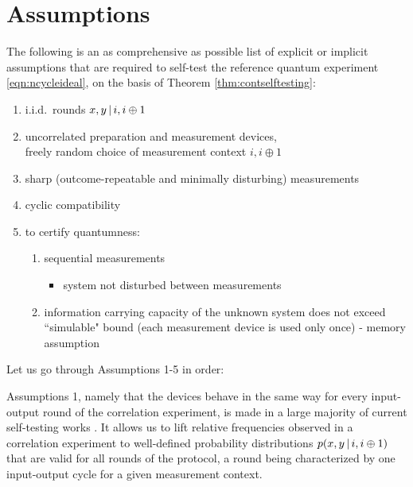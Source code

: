 \section{Assumptions}
\label{sec:kscontass}
The following is an as comprehensive as possible list of explicit or implicit assumptions that are required to self-test the reference quantum experiment \ref{eqn:ncycleideal}, on the basis of Theorem \ref{thm:contselftesting}:
\begin{enumerate}
    \item i.i.d.\ rounds $x,y \thinspace\vert\thinspace i,i\oplus 1$
    \item uncorrelated preparation and measurement devices,\\ freely random choice of measurement context $i,i\oplus 1$
    \item sharp (outcome-repeatable and minimally disturbing) measurements 
    \item cyclic compatibility
    \item to certify quantumness:
    \begin{enumerate}
    \item sequential measurements
    \begin{itemize}
        \item system not disturbed between measurements
    \end{itemize}
    \item information carrying capacity of the unknown system does not exceed ``simulable" bound (each measurement device is used only once) - memory assumption \cite{Bharti2019}
    
     \end{enumerate}
\end{enumerate}

Let us go through Assumptions 1-5 in order:

Assumptions 1, namely that the devices behave in the same way for every input-output round of the correlation experiment, is made in a large majority of current self-testing works \cite{Supic2020}. It allows us to lift relative frequencies observed in a correlation experiment to well-defined probability distributions $p(x,y\thinspace\vert\thinspace i, i\oplus 1)$ that are valid for all rounds of the protocol, a round being characterized by one input-output cycle for a given measurement context.

